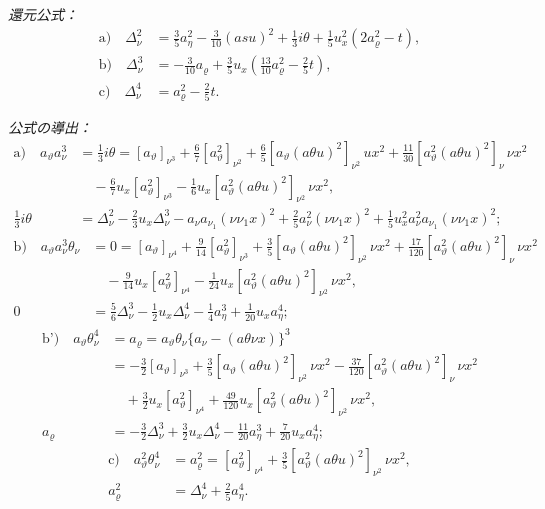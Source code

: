 \documentclass[11pt]{article}
\newcommand{\A}{\Delta}
\newcommand{\R}{\varrho}
\begin{document}
\noindent\emph{還元公式：}
\[
\tag{10}
\begin{aligned}
\text{a)}\quad \A_\nu^2
&=\frac35a_\eta^2-\frac3{10}(asu)^2+\frac13 i\theta
+\frac15u_x^2(2a_\R^2-t),\\
\text{b)}\quad \A_\nu^3
&=-\frac3{10}a_\R+\frac35u_x\left(\frac{13}{10}a_\R^2-\frac25t\right),\\
\text{c)}\quad \A_\nu^4&=a_\R^2-\frac25t.
\end{aligned}
\]

\noindent\emph{公式の導出：}
\[
\begin{aligned}
\text{a)}\quad
 a_\vartheta a_\nu^3
&=\frac13 i\theta
=[a_\vartheta]_{\nu^3}+\frac67[a_\vartheta^2]_{\nu^2}
+\frac65[a_\vartheta(a\theta u)^2]_{\nu^2}\, u x^2
+\frac{11}{30}[a_\vartheta^2(a\theta u)^2]_\nu\,\nu x^2\\
&\quad-\frac67u_x[a_\vartheta^2]_{\nu^3}
-\frac16u_x[a_\vartheta^2(a\theta u)^2]_{\nu^2}\,\nu x^2,\\
\frac13 i\theta
&=\A_\nu^2-\frac23u_x\A_\nu^3-a_\nu a_{\nu_1}(\nu\nu_1x)^2
+\frac25a_\nu^2(\nu\nu_1x)^2
+\frac15u_x^2a_\nu^2a_{\nu_1}(\nu\nu_1x)^2;
\end{aligned}
\]
\[
\begin{aligned}
\text{b)}\quad
 a_\vartheta a_\nu^3\theta_\nu
&=0=[a_\vartheta]_{\nu^4}+\frac9{14}[a_\vartheta^2]_{\nu^3}
+\frac35[a_\vartheta(a\theta u)^2]_{\nu^2}\,\nu x^2
+\frac{17}{120}[a_\vartheta^2(a\theta u)^2]_{\nu}\,\nu x^2\\
&\quad-\frac9{14}u_x[a_\vartheta^2]_{\nu^4}
-\frac1{24}u_x[a_\vartheta^2(a\theta u)^2]_{\nu^2}\,\nu x^2,\\
0&=\frac56\A_\nu^3-\frac12u_x\A_\nu^4-\frac14a_\eta^3+\frac1{20}u_xa_\eta^4;
\end{aligned}
\]
\[
\begin{aligned}
\text{b')}\quad
 a_\vartheta\theta_\nu^4
&=a_\R=a_\vartheta\theta_\nu\{a_\nu-(a\theta\nu x)\}^3\\
&=-\frac32[a_\vartheta]_{\nu^3}+\frac35[a_\vartheta(a\theta u)^2]_{\nu^2}\,\nu x^2
-\frac{37}{120}[a_\vartheta^2(a\theta u)^2]_{\nu}\,\nu x^2\\
&\quad+\frac32u_x[a_\vartheta^2]_{\nu^4}
+\frac{49}{120}u_x[a_\vartheta^2(a\theta u)^2]_{\nu^2}\,\nu x^2,\\
a_\R&=-\frac32\A_\nu^3+\frac32u_x\A_\nu^4-\frac{11}{20}a_\eta^3+\frac7{20}u_xa_\eta^4;
\end{aligned}
\]
\[
\begin{aligned}
\text{c)}\quad
 a_\vartheta^2\theta_\nu^4
&=a_\R^2=[a_\vartheta^2]_{\nu^4}+\frac35[a_\vartheta^2(a\theta u)^2]_{\nu^2}\,\nu x^2,\\
a_\R^2&=\A_\nu^4+\frac25a_\eta^4.
\end{aligned}
\]
\end{document}

